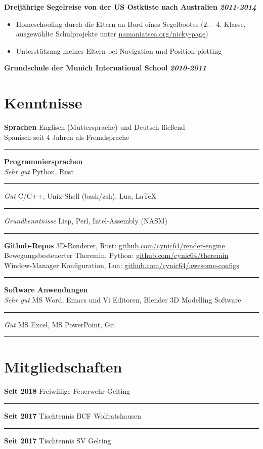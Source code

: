 \documentclass[12pt]{article}
\newcommand{\link}[1]{{\color{blue}\underline{#1}}}
\newcommand{\sect}[1]{
  {
    \vspace{12pt}
    \section*{
      \fontsize{18}{0}\selectfont
      \hspace{-12pt}
      \vspace{-12pt}
      #1
    }
    \vspace{-6pt}
  }
}
\newcommand{\sep}{{\color{gray}\vspace{-12pt}\hrule}}
\begin{document}
\textbf{Dreij{\"a}hrige Segelreise von der US Ostk{\"u}ste nach Australien} \hfill{\textit{\textbf{2011-2014}}}

\vspace{-18pt}
\begin{itemize}[leftmargin=*]
  \itemsep3pt

\item Homeschooling durch die Eltern an Bord eines Segelbootes (2. - 4. Klasse,
  ausgew{\"a}hlte Schulprojekte unter \link{namaniatsea.org/nicky-page})

\item Unterst{\"u}tzung meiner Eltern bei Navigation und Position-plotting

\end{itemize}
\vspace{-6pt}

\textbf{Grundschule der Munich International School} \hfill{\textit{\textbf{2010-2011}}}

\pagebreak

\sect{Kenntnisse}
\textbf{Sprachen} \hfill{Englisch (Muttersprache) und Deutsch flie{\ss}end} \\
\hspace*{\fill}Spanisch seit 4 Jahren als Fremdsprache \\
\sep
\vspace{12pt}

\textbf{Programmiersprachen} \\
\textit{Sehr gut} \hfill{Python, Rust} \\
\sep
\textit{Gut} \hfill{C/C++, Unix-Shell (bash/zsh), Lua, \LaTeX} \\
\sep
\textit{Grundkenntnisse} \hfill{Lisp, Perl, Intel-Assembly (NASM)} \\
\sep
\vspace{12pt}

{
  \small
  \textbf{Github-Repos} \hfill{3D-Renderer, Rust: \link{github.com/cynic64/render-engine}} \\
  \hspace*{\fill} Bewegungsbesteuerter Theremin, Python: \link{github.com/cynic64/theremin} \\
  \hspace*{\fill} Window-Manager Konfiguration, Lua:
  \link{github.com/cynic64/awesome-configs} \\
}
\sep
\vspace{12pt}

\textbf{Software Anwendungen} \\
\textit{Sehr gut} \hfill{MS Word, Emacs und Vi Editoren, Blender 3D Modelling Software} \\
\sep
\textit{Gut} \hfill{MS Excel, MS PowerPoint, Git} \\
\sep
\vspace{12pt}

\sect{Mitgliedschaften}

\textbf{Seit 2018} \hfill{Freiwillige Feuerwehr Gelting} \\
\sep
\textbf{Seit 2017} \hfill{Tischtennis BCF Wolfratshausen} \\
\sep
\textbf{Seit 2017} \hfill{Tischtennis SV Gelting}
\end{document}
